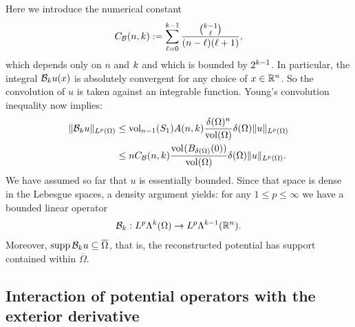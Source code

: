 \documentclass[10pt,a4paper]{article}
\begin{document}
Here we introduce the numerical constant 
\begin{gather}\label{equation:A_Bogov}
    C_{{\mathcal B}}(n,k) := \sum_{\ell=0}^{k-1} \frac{ \tbinom{k-1}{\ell} }{ (n-\ell)(\ell+1) }, 
\end{gather}
which depends only on $n$ and $k$ and which is bounded by $2^{k-1}$. 
In particular, the integral ${\mathcal B}_{k} u(x)$ is absolutely convergent for any choice of $x \in {\mathbb R}^{n}$. 
So the convolution of $u$ is taken against an integrable function. 
Young's convolution inequality now implies: 
\begin{align*}
    \| {\mathcal B}_{k} u \|_{L^{p}(\Omega)}
    &
    \leq 
    \operatorname{vol}_{n-1}(S_1) A(n,k) \frac{ {\delta}(\Omega)^{n} }{\operatorname{vol}(\Omega)} 
    {\delta}(\Omega)
    \| u \|_{L^{p}(\Omega)}
    \\&
    \leq 
    n C_{{\mathcal B}}(n,k) \frac{ \operatorname{vol}_{}(B_{{\delta}(\Omega)}(0)) }{\operatorname{vol}(\Omega)} 
    {\delta}(\Omega)
    \| u \|_{L^{p}(\Omega)}
    .
\end{align*}
We have assumed so far that $u$ is essentially bounded.
Since that space is dense in the Lebesgue spaces, a density argument yields: 
for any $1 \leq p \leq \infty$ we have a bounded linear operator 
\begin{gather*}
    {\mathcal B}_{k} : L^{p}\Lambda^{k}(\Omega) \rightarrow L^{p}\Lambda^{k-1}({\mathbb R}^n).
\end{gather*}
Moreover, $\operatorname{supp} {\mathcal B}_{k} u \subseteq \overline\Omega$,
that is, the reconstructed potential has support contained within $\overline\Omega$. 
\\





\subsection{Interaction of potential operators with the exterior derivative}
\end{document}
